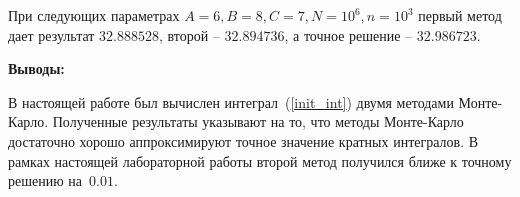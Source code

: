 При следующих параметрах $A = 6, B = 8, C = 7, N = 10 ^ 6, n = 10 ^ 3$ первый метод дает результат $32.888528$, второй -- $32.894736$, а точное решение -- $32.986723$.

\textbf{Выводы:}

В настоящей работе был вычислен интеграл~(\ref{init_int}) двумя методами Монте-Карло. Полученные результаты указывают на то, что методы Монте-Карло достаточно хорошо аппроксимируют точное значение кратных интегралов. В рамках настоящей лабораторной работы второй метод получился ближе к точному решению на~$0.01$.